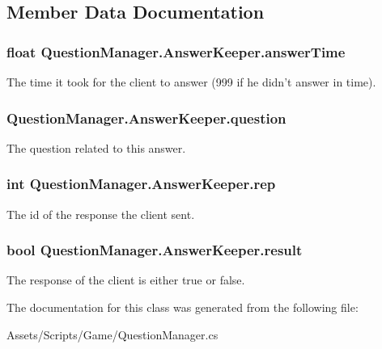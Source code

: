 \subsection{Member Data Documentation}
\hypertarget{class_question_manager_1_1_answer_keeper_acf690b9c1dbdd09140826d8433e220e8}{
\subsubsection[{answer\-Time}]{\setlength{\rightskip}{0pt plus 5cm}float Question\-Manager.\-Answer\-Keeper.\-answer\-Time}}\label{class_question_manager_1_1_answer_keeper_acf690b9c1dbdd09140826d8433e220e8}


The time it took for the client to answer (999 if he didn't answer in time).

\hypertarget{class_question_manager_1_1_answer_keeper_a5f78a95b6ab1f7f094d857924eea9aa1}{
\subsubsection[{question}]{ Question\-Manager.\-Answer\-Keeper.\-question}}\label{class_question_manager_1_1_answer_keeper_a5f78a95b6ab1f7f094d857924eea9aa1}


The question related to this answer.

\hypertarget{class_question_manager_1_1_answer_keeper_ad0ed5f3d9c55dd4269825d9a25b9f163}{
\subsubsection[{rep}]{\setlength{\rightskip}{0pt plus 5cm}int Question\-Manager.\-Answer\-Keeper.\-rep}}\label{class_question_manager_1_1_answer_keeper_ad0ed5f3d9c55dd4269825d9a25b9f163}


The id of the response the client sent.

\hypertarget{class_question_manager_1_1_answer_keeper_ab0b449e6db655f4acaa3141f85867587}{
\subsubsection[{result}]{\setlength{\rightskip}{0pt plus 5cm}bool Question\-Manager.\-Answer\-Keeper.\-result}}\label{class_question_manager_1_1_answer_keeper_ab0b449e6db655f4acaa3141f85867587}


The response of the client is either true or false.



The documentation for this class was generated from the following file\-:\begin{DoxyCompactItemize}
\item 
Assets/\-Scripts/\-Game/Question\-Manager.\-cs\end{DoxyCompactItemize}
